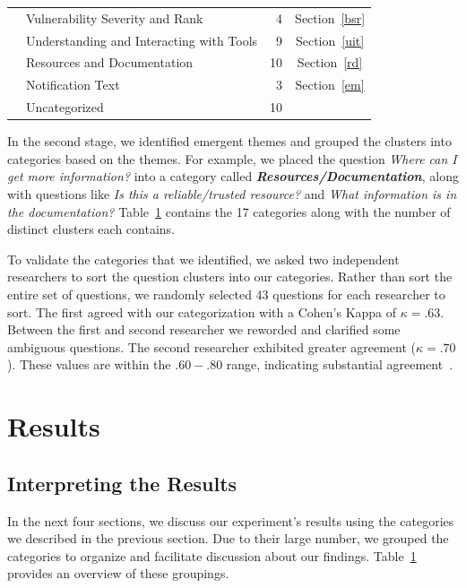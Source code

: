 \documentclass{acm_proc_article-sp}
\begin{document}
\begin{table}
\begin{tabularx}{\textwidth}{|l|X|r|c|}
    									& Vulnerability Severity and Rank											& 4     		& Section~\ref{bsr}		\\

    									& Understanding and Interacting with Tools						& 9     		& Section~\ref{uit}			\\

   	 									& Resources and Documentation									& 10     		& Section~\ref{rd}		\\

    									& Notification Text												& 3     		& Section~\ref{em}		\\
    \hline	
       									& Uncategorized													& 10    		&			 \\
    \hline
\end{tabularx}
\label{table:categories}
\end{table}


In the second stage, we identified emergent themes and grouped the clusters into categories based on the themes. 
For example, we placed the question \textit{Where can I get more information?} into a category called \emph{\textbf{Resources/Documentation}}, along with questions like \textit{Is this a reliable/trusted resource?} and \textit{What information is in the documentation?} 
Table~\ref{table:categories} contains the 17 categories along with the number of distinct clusters each contains. 

To validate the categories that we identified, we asked two independent researchers to sort the question clusters into our categories. 
Rather than sort the entire set of questions, we randomly selected 43 questions for each researcher to sort.
The first agreed with our categorization with a Cohen's Kappa of $\kappa = .63$. 
Between the first and second researcher we reworded and clarified some ambiguous questions. The second researcher exhibited greater agreement ($\kappa = .70$). 
These values are within the $.60 - .80$ range, indicating substantial agreement~\cite{Landis1977agreement}.

\section{Results}

\subsection{Interpreting the Results}
\label{sec:results}

In the next four sections, we discuss our experiment's results using the categories we described in the previous section.
Due to their large number, we grouped the categories to organize and facilitate discussion about our findings. 
Table~\ref{table:categories} provides an overview of these groupings.
\end{document}
